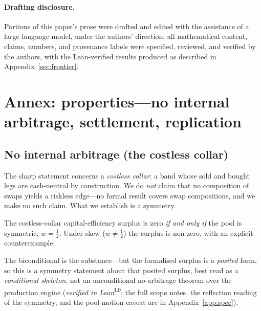 \documentclass[runningheads]{llncs}
\newcommand{\tfp}{\emph{verified in Lean}}
\begin{document}
\paragraph{Drafting disclosure.}
Portions of this paper's prose were drafted and edited with the assistance of a
large language model, under the authors' direction; all mathematical content,
claims, numbers, and provenance labels were specified, reviewed, and verified by
the authors, with the Lean-verified results produced as described in
Appendix~\ref{sec:frontier}.

\appendix
\section{Annex: properties---no internal arbitrage, settlement, replication}\label{app:properties}
\label{sec:props}

\subsection{No internal arbitrage (the costless collar)}
The sharp statement concerns a \emph{costless collar}: a band whose sold and
bought legs are cash-neutral by construction. We do \emph{not} claim that no
composition of swaps yields a riskless edge---no formal result covers swap
compositions, and we make no such claim. What we establish is a symmetry.

\begin{proposition}\label{prop:collar}
The costless-collar capital-efficiency surplus is zero \emph{if and only if} the
pool is symmetric, $w=\tfrac12$. Under skew ($w\neq\tfrac12$) the surplus is
non-zero, with an explicit counterexample.
\end{proposition}

The biconditional is the substance---but the formalised surplus is a
\emph{posited} form, so this is a symmetry statement about that posited surplus,
best read as a \emph{conditional skeleton}, not an unconditional no-arbitrage
theorem over the production engine (\tfp{}\textsuperscript{L9}; the full scope
notes, the reflection reading of the symmetry, and the pool-motion caveat are in
Appendix~\ref{app:spec}).
\end{document}
